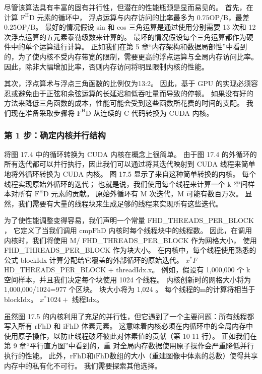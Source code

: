 尽管该算法具有丰富的固有并行性，但潜在的性能瓶颈是显而易见的。 
首先，在计算 $\mathrm{F}^{\mathrm{H}} \mathrm{D}$ 元素的循环中，
浮点运算与内存访问的比率最多为 $0.75 \mathrm{OP} / \mathrm{B}$，最差 $0.25 \mathrm{OP} / \mathrm{B}$。 
最好的情况假设 sin 和 cos 三角运算是通过使用分别需要 13 次和 12 次浮点运算的五元素泰勒级数来计算的。 
最坏的情况假设每个三角运算都作为硬件中的单个运算进行计算。 
正如我们在第 5 章“内存架构和数据局部性”中看到的，为了使内核不受内存带宽的限制，需要更高的浮点运算与全局内存访问比率。 
因此，除非大幅增加比率，否则内存访问将明显限制内核的性能。

其次，浮点算术与浮点三角函数的比例仅为13:2。 
因此，基于 GPU 的实现必须容忍或避免由于正弦和余弦运算的长延迟和低吞吐量而导致的停顿。 
如果没有好的方法来降低三角函数的成本，性能可能会受到这些函数所花费的时间的支配。 
我们现在准备采取步骤将 $\mathrm{F}^{\mathrm{H}} \mathrm{D}$ 从连续的 $\mathrm{C}$ 代码转换为 CUDA 内核。

\subsubsection{第 1 步：确定内核并行结构}
将图 17.4 中的循环转换为 CUDA 内核在概念上很简单。 
由于图 17.4 的外循环的所有迭代都可以并行执行，因此我们可以通过将其迭代映射到 CUDA 线程来简单地将外循环转换为 CUDA 内核。 
图 17.5 显示了来自这种简单转换的内核。 每个线程实现原始外循环的迭代； 
也就是说，我们使用每个线程来计算一个 k 空间样本对所有 $\mathrm{F}^{\mathrm{H}} \mathrm{D}$ 元素的贡献。 
原始外循环有 $\mathrm{M}$ 次迭代，$\mathrm{M}$ 可能有数百万次。 
显然，我们需要有大量的线程块来生成足够的线程来实现所有这些迭代。

为了使性能调整变得容易，我们声明一个常量 FHD\_THREADS\_PER\_BLOCK ，
它定义了当我们调用 $\mathrm{cmpFhD}$ 内核时每个线程块中的线程数。 
因此，在调用内核时，我们将使用 M/ FHD\_THREADS\_PER\_BLOCK 作为网格大小，
使用 FHD\_THREADS\_PER\_BLOCK 作为块大小。 
在内核中，每个线程使用熟悉的公式 blockIdx 计算分配给它覆盖的外部循环的原始迭代。 
$x^{*} F$ HD\_THREADS\_PER\_BLOCK + threadIdx.x。 
例如，假设有 1,000,000 个 k 空间样本，并且我们决定每个块使用 1024 个线程。 
内核创新时的网格大小将为 1,000,000/1024=977 个区块。 块大小将为 1,024 。 
每个线程的$\mathrm{m}$的计算将相当于blockIdx。 $x^{*} 1024+$ 线程Idx。

虽然图 17.5 的内核利用了充足的并行性，但它遇到了一个主要问题：所有线程都写入所有 $\mathrm{rFhD}$ 
和 $\mathrm{iFhD}$ 体素元素。 
这意味着内核必须在内循环中的全局内存中使用原子操作，以防止线程破坏彼此对体素值的贡献（第 10-11 行）。 
正如我们在第 9 章“平行直方图”中看到的，重
对全局内存数据使用原子操作会严重降低并行执行的性能。 
此外，$\mathrm{rFhD}$和$\mathrm{iFhD}$数组的大小（重建图像中体素的总数）使得共享内存中的私有化不可行。 
我们需要探索其他选择。

